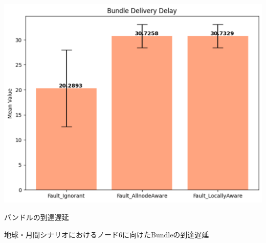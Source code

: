\begin{table}[tbh]
    \centering
    \includegraphics[width=0.7\textheight]{results/results_20250116/moon_delay.pdf}
    \caption{バンドルの到達遅延}
    \label{fig:graph_bundle_earth_moon}
    \begin{minipage}{\textwidth}
        \centering
        \vspace{3mm}
        地球・月間シナリオにおけるノード6に向けたBundleの到達遅延
    \end{minipage}
\end{table}

